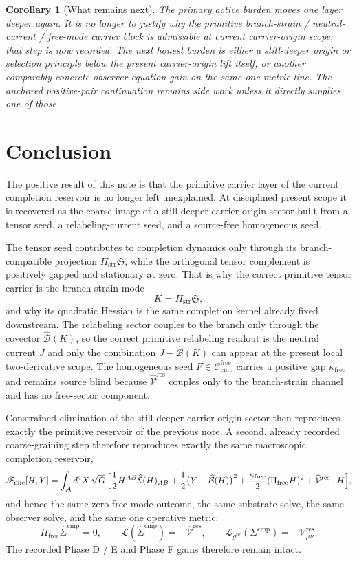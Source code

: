 \documentclass[11pt]{article}
\newcommand{\Sub}{\mathcal A}
\newcommand{\ObserverMetric}{g^{\mathrm{br}}}
\newcommand{\CompShift}{\Sigma^{\mathrm{cmp}}}
\newcommand{\CompLift}{\widehat\Sigma^{\mathrm{cmp}}}
\newcommand{\ResidualCore}{\mathcal V_{\mu\nu}^{\mathrm{res}}}
\newcommand{\ResidualLift}{\widehat{\mathcal V}^{\mathrm{res}}}
\newcommand{\SubEinLin}{\widehat{\mathcal E}}
\newcommand{\SubGaugeVec}{\widehat{\mathcal B}}
\newcommand{\SubReducedEin}{\widehat{\mathcal L}}
\newcommand{\FreeProj}{\Pi_{\mathrm{free}}}
\newcommand{\GaugeAux}{Y}
\newcommand{\ReducedEin}{\mathcal L_{\ObserverMetric}}
\newcommand{\CompFree}{\mathscr C_{\mathrm{cmp}}^{\mathrm{free}}}
\newcommand{\MicFunctional}{\mathscr F_{\mathrm{mic}}}
\newcommand{\FreeStiff}{\kappa_{\mathrm{free}}}
\newcommand{\PrimStrain}{K}
\newcommand{\PrimNeutral}{J}
\newcommand{\PrimFree}{F}
\newcommand{\CarrierProj}{\Pi_{\mathrm{str}}}
\newcommand{\CarrierSeed}{\mathfrak S}
\newtheorem{corollary}{Corollary}
\begin{document}
\begin{corollary}[What remains next]
The primary active burden moves one layer deeper again. It is no longer to justify why the primitive branch-strain / neutral-current / free-mode carrier block is admissible at current carrier-origin scope; that step is now recorded. The next honest burden is either a still-deeper origin or selection principle below the present carrier-origin lift itself, or another comparably concrete observer-equation gain on the same one-metric line. The anchored positive-pair continuation remains side work unless it directly supplies one of those.
\end{corollary}

\section{Conclusion}

The positive result of this note is that the primitive carrier layer of the current completion reservoir is no longer left unexplained. At disciplined present scope it is recovered as the coarse image of a still-deeper carrier-origin sector built from a tensor seed, a relabeling-current seed, and a source-free homogeneous seed.

The tensor seed contributes to completion dynamics only through its branch-compatible projection \(\CarrierProj\CarrierSeed\), while the orthogonal tensor complement is positively gapped and stationary at zero. That is why the correct primitive tensor carrier is the branch-strain mode
\[
\PrimStrain=\CarrierProj\CarrierSeed,
\]
and why its quadratic Hessian is the same completion kernel already fixed downstream. The relabeling sector couples to the branch only through the covector \(\widehat{\mathcal B}(\PrimStrain)\), so the correct primitive relabeling readout is the neutral current \(\PrimNeutral\) and only the combination \(\PrimNeutral-\widehat{\mathcal B}(\PrimStrain)\) can appear at the present local two-derivative scope. The homogeneous seed \(\PrimFree\in\CompFree\) carries a positive gap \(\FreeStiff\) and remains source blind because \(\ResidualLift\) couples only to the branch-strain channel and has no free-sector component.

Constrained elimination of the still-deeper carrier-origin sector then reproduces exactly the primitive reservoir of the previous note. A second, already recorded coarse-graining step therefore reproduces exactly the same macroscopic completion reservoir,
\[
\MicFunctional[H,\GaugeAux]
=
\int_{\Sub} d^4X\,\sqrt{G}\,
\Bigl[
\frac12 H^{AB}\SubEinLin(H)_{AB}
+\frac12\bigl(\GaugeAux-\SubGaugeVec(H)\bigr)^2
+\frac{\FreeStiff}{2}(\FreeProj H)^2
+\ResidualLift\cdot H
\Bigr],
\]
and hence the same zero-free-mode outcome, the same substrate solve, the same observer solve, and the same one operative metric:
\[
\FreeProj\CompLift=0,
\qquad
\SubReducedEin(\CompLift)=-\ResidualLift,
\qquad
\ReducedEin(\CompShift)=-\ResidualCore.
\]
The recorded Phase D / E and Phase F gains therefore remain intact.
\end{document}
